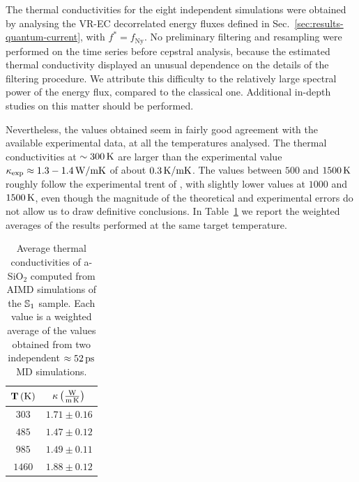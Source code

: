 The \abinitio thermal conductivities for the eight independent simulations were obtained by analysing the VR-EC decorrelated energy fluxes defined in Sec.~\ref{sec:results-quantum-current}, with $f^*=f_\mathrm{Ny}$. 
No preliminary filtering and resampling were performed on the time series before cepstral analysis, because the estimated thermal conductivity displayed an unusual dependence on the details of the filtering procedure. We attribute this difficulty to the relatively large spectral power of the \abinitio energy flux, compared to the classical one. 
Additional in-depth studies on this matter should be performed. 

Nevertheless, the values obtained seem in fairly good agreement with the available experimental data, at all the temperatures analysed. 
The thermal conductivities at $\sim 300\,\mathrm{K}$ are larger than the experimental value $\kappa_{\mathrm{exp}}\approx 1.3-1.4\,\mathrm{W/mK}$ of about $0.3\,\mathrm{K/mK}$. 
The values between $500$ and $1500\,\mathrm{K}$ roughly follow the experimental trent of \textcite{Cahill1990}, with slightly lower values at $1000$ and $1500\,\mathrm{K}$, even though the magnitude of the theoretical and experimental errors do not allow us to draw definitive conclusions. 
In Table~\ref{tab:results-quantum-wkappa} we report the weighted averages of the \abinitio results performed at the same target temperature.

\begin{table}[!tb]
    \centering
    \begin{tabular}{c|c}
        $\mathbf{T}\,\mathrm{(K)}$ & $\mathbf{\kappa}\,\mathrm{\left(\frac{W}{m\,K}\right)}$ \\
        \hline
        $303$ & $1.71 \pm 0.16$ \\
        $485$ & $1.47 \pm 0.12$ \\
        $985$ & $1.49 \pm 0.11$ \\
        $1460$ & $1.88 \pm 0.12$ \\
    \end{tabular}
    \caption{Average thermal conductivities of a-SiO$_2$ computed from AIMD simulations of the $\S1$ sample. Each value is a weighted average of the values obtained from two independent $\approx 52\,\mathrm{ps}$ MD simulations.}
    \label{tab:results-quantum-wkappa}
\end{table}

